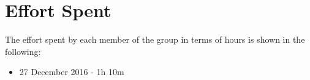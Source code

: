 \section{Effort Spent}

The effort spent by each member of the group in terms of hours is shown in the following:

\begin{itemize}
	\item 27 December 2016 - 1h 10m
\end{itemize}
